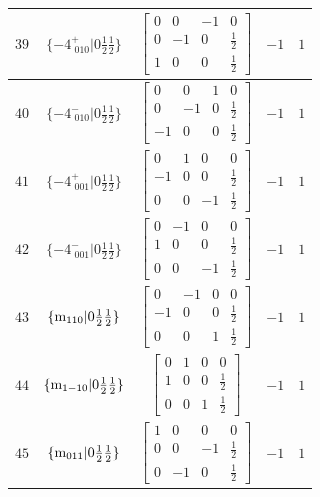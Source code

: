 \documentclass[fleqn,8pt]{jsarticle}
\begin{document}
\begin{longtable}{ccccc}
$ 39 $ & $ \{-4^{+}_{\,\,010}|0 \frac{1}{2} \frac{1}{2}\} $ & $ \begin{bmatrix} 0 & 0 & -1 & 0 \\ 0 & -1 & 0 & \frac{1}{2} \\ 1 & 0 & 0 & \frac{1}{2} \end{bmatrix} $ & $ -1 $ & $ 1 $ \\ \hline
$ 40 $ & $ \{-4^{-}_{\,\,010}|0 \frac{1}{2} \frac{1}{2}\} $ & $ \begin{bmatrix} 0 & 0 & 1 & 0 \\ 0 & -1 & 0 & \frac{1}{2} \\ -1 & 0 & 0 & \frac{1}{2} \end{bmatrix} $ & $ -1 $ & $ 1 $ \\ \hline
$ 41 $ & $ \{-4^{+}_{\,\,001}|0 \frac{1}{2} \frac{1}{2}\} $ & $ \begin{bmatrix} 0 & 1 & 0 & 0 \\ -1 & 0 & 0 & \frac{1}{2} \\ 0 & 0 & -1 & \frac{1}{2} \end{bmatrix} $ & $ -1 $ & $ 1 $ \\ \hline
$ 42 $ & $ \{-4^{-}_{\,\,001}|0 \frac{1}{2} \frac{1}{2}\} $ & $ \begin{bmatrix} 0 & -1 & 0 & 0 \\ 1 & 0 & 0 & \frac{1}{2} \\ 0 & 0 & -1 & \frac{1}{2} \end{bmatrix} $ & $ -1 $ & $ 1 $ \\ \hline
$ 43 $ & $ \{{\rm m}_{110}|0 \frac{1}{2} \frac{1}{2}\} $ & $ \begin{bmatrix} 0 & -1 & 0 & 0 \\ -1 & 0 & 0 & \frac{1}{2} \\ 0 & 0 & 1 & \frac{1}{2} \end{bmatrix} $ & $ -1 $ & $ 1 $ \\ \hline
$ 44 $ & $ \{{\rm m}_{1-10}|0 \frac{1}{2} \frac{1}{2}\} $ & $ \begin{bmatrix} 0 & 1 & 0 & 0 \\ 1 & 0 & 0 & \frac{1}{2} \\ 0 & 0 & 1 & \frac{1}{2} \end{bmatrix} $ & $ -1 $ & $ 1 $ \\ \hline
$ 45 $ & $ \{{\rm m}_{011}|0 \frac{1}{2} \frac{1}{2}\} $ & $ \begin{bmatrix} 1 & 0 & 0 & 0 \\ 0 & 0 & -1 & \frac{1}{2} \\ 0 & -1 & 0 & \frac{1}{2} \end{bmatrix} $ & $ -1 $ & $ 1 $ \\ \hline

\end{longtable}
\end{document}
